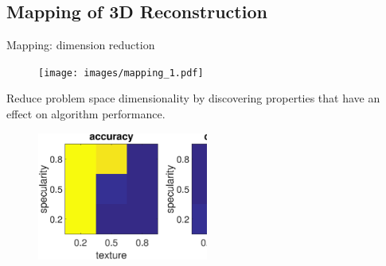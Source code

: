 \documentclass[10pt]{beamer}
\begin{document}
\subsection{Mapping of 3D Reconstruction}



\begin{frame}{Mapping: dimension reduction}

\begin{figure}
\centering
\texttt{[image: images/mapping\_1.pdf]}
\end{figure}

Reduce problem space dimensionality by discovering properties that have an effect on algorithm performance.

\begin{figure}
\centering
\includegraphics[width=0.5\textwidth]{mapping/eval_prop/mvs_tex_spec}
\end{figure}

\end{frame}
\end{document}
